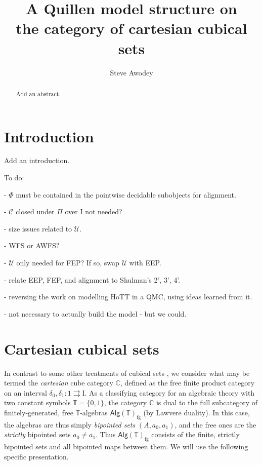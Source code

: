 \documentclass[12pt]{article}
\newcommand{\C}{\ensuremath{\mathbb{C}}}
\newcommand{\CC}{\ensuremath{\mathcal{C}}}
\newcommand{\I}{\ensuremath{\mathrm{I}}}
\newcommand{\U}{\ensuremath{\mathcal{U}}}
\theoremstyle{remark}
\theoremstyle{definition}
\begin{document}

\title{A Quillen model structure on\\
the category of cartesian cubical sets}
\author{Steve Awodey}
\maketitle

\begin{abstract}
Add an abstract.
\end{abstract}

\setcounter{tocdepth}{1}
\tableofcontents

\section*{Introduction}

Add an introduction.

To do:

- $\Phi$ must be contained in the pointwise decidable subobjects for alignment.

- $\CC$ closed under $\Pi$ over $\I$ not needed?

- size issues related to $\U$.

- WFS or AWFS?

- $\U$ only needed for FEP? If so, swap $\U$ with EEP.

- relate EEP, FEP, and alignment to Shulman's 2', 3', 4'.

- reversing the work on modelling HoTT in a QMC, using ideas learned from it.

- not necessary to actually build the model - but we could.

\section{Cartesian cubical sets}

In contrast to some other treatments of cubical sets \cite{Grandis, Grandis, Jardine, Jardine, Bezem, OrtonPitts, Coquand, Cisinski}, we consider what may be termed the \emph{cartesian} cube category  $\mathbb{C}$, defined as the free finite product category on an interval $\delta_0, \delta_1 : 1\rightrightarrows \I$.
As a classifying category for an algebraic theory with two constant symbols $\mathbb{T} = \{0, 1\}$, the category $\C$ is dual to the full subcategory of finitely-generated, free $\mathbb{T}$-algebras $\mathsf{Alg}(\mathbb{T})_{\mathrm{fg}}$ (by Lawvere duality).  In this case, the algebras are thus simply \emph{bipointed sets} $(A, a_0, a_1)$, and the free ones are the \emph{strictly} bipointed sets $a_0\neq a_1$.  Thus $\mathsf{Alg}(\mathbb{T})_{\mathrm{fg}}$ consists of the finite, strictly bipointed sets and all bipointed maps between them.  We will use the following specific presentation.
\end{document}
